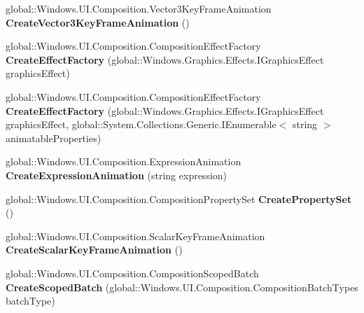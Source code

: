 \begin{DoxyCompactItemize}
global\+::\+Windows.\+U\+I.\+Composition.\+Vector3\+Key\+Frame\+Animation {\bfseries Create\+Vector3\+Key\+Frame\+Animation} ()
\item 
\mbox{\label{interface_windows_1_1_u_i_1_1_composition_1_1_i_compositor_a741d4bb0d7eef4b99352ca5c3f31e3ab}} 
global\+::\+Windows.\+U\+I.\+Composition.\+Composition\+Effect\+Factory {\bfseries Create\+Effect\+Factory} (global\+::\+Windows.\+Graphics.\+Effects.\+I\+Graphics\+Effect graphics\+Effect)
\item 
\mbox{\label{interface_windows_1_1_u_i_1_1_composition_1_1_i_compositor_ad3ceab4f5a5f9bcd7b75ff2449c924f2}} 
global\+::\+Windows.\+U\+I.\+Composition.\+Composition\+Effect\+Factory {\bfseries Create\+Effect\+Factory} (global\+::\+Windows.\+Graphics.\+Effects.\+I\+Graphics\+Effect graphics\+Effect, global\+::\+System.\+Collections.\+Generic.\+I\+Enumerable$<$ string $>$ animatable\+Properties)
\item 
\mbox{\label{interface_windows_1_1_u_i_1_1_composition_1_1_i_compositor_a6edffff7da37deafae21b5d37ae75419}} 
global\+::\+Windows.\+U\+I.\+Composition.\+Expression\+Animation {\bfseries Create\+Expression\+Animation} (string expression)
\item 
\mbox{\label{interface_windows_1_1_u_i_1_1_composition_1_1_i_compositor_a65caaced591df89e953360feef3dc21c}} 
global\+::\+Windows.\+U\+I.\+Composition.\+Composition\+Property\+Set {\bfseries Create\+Property\+Set} ()
\item 
\mbox{\label{interface_windows_1_1_u_i_1_1_composition_1_1_i_compositor_a0fbfc1dc456d3dee8d1faf78bfe40c9a}} 
global\+::\+Windows.\+U\+I.\+Composition.\+Scalar\+Key\+Frame\+Animation {\bfseries Create\+Scalar\+Key\+Frame\+Animation} ()
\item 
\mbox{\label{interface_windows_1_1_u_i_1_1_composition_1_1_i_compositor_ace9715f39dc12e329752515c931e5b77}} 
global\+::\+Windows.\+U\+I.\+Composition.\+Composition\+Scoped\+Batch {\bfseries Create\+Scoped\+Batch} (global\+::\+Windows.\+U\+I.\+Composition.\+Composition\+Batch\+Types batch\+Type)

\end{DoxyCompactItemize}
